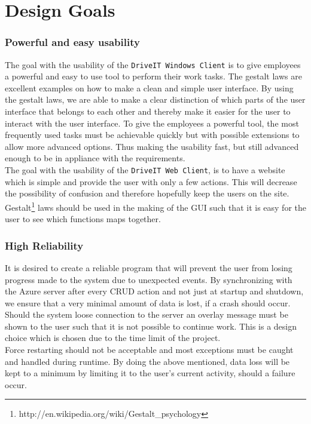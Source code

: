 \section{Design Goals}
\subsubsection{Powerful and easy usability}
The goal with the usability of the \texttt{DriveIT Windows Client} is to give employees a powerful and easy to use tool to perform their work tasks. The gestalt laws are excellent examples on how to make a clean and simple user interface. By using the gestalt laws, we are able to make a clear distinction of which parts of the user interface that belongs to each other and thereby make it easier for the user to interact with the user interface. To give the employees a powerful tool, the most frequently used tasks must be achievable quickly but with possible extensions to allow more advanced options. Thus making the usability fast, but still advanced enough to be in appliance with the requirements.\\

The goal with the usability of the \texttt{DriveIT Web Client}, is to have a website which is simple and provide the user with only a few actions. This will decrease the possibility of confusion and therefore hopefully keep the users on the site. Gestalt\footnote{http://en.wikipedia.org/wiki/Gestalt_psychology} laws should be used in the making of the GUI such that it is easy for the user to see which functions maps together. 

\subsubsection{High Reliability} It is desired to create a reliable program that will prevent the user from losing progress made to the system due to unexpected events. By synchronizing with the Azure server after every CRUD action and not just at startup and shutdown, we ensure that a very minimal amount of data is lost, if a crash should occur. Should the system loose connection to the server an overlay message must be shown to the user such that it is not possible to continue work. This is a design choice which is chosen due to the time limit of the project. \\
Force restarting should not be acceptable and most exceptions must be caught and handled during runtime. By doing the above mentioned, data loss will be kept to a minimum by limiting it to the user's current activity, should a failure occur.

